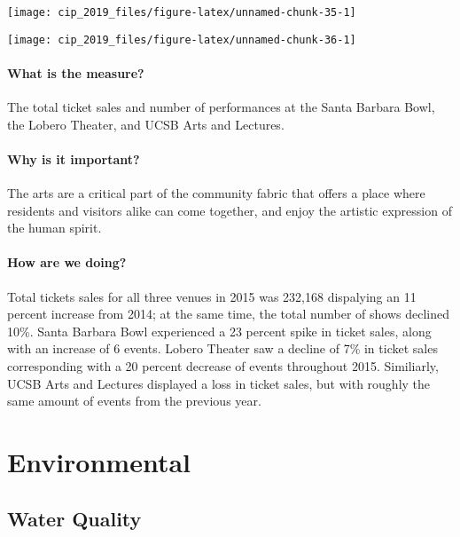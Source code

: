 \documentclass[]{book}
\theoremstyle{definition}
\theoremstyle{definition}
\theoremstyle{definition}
\theoremstyle{remark}
\begin{document}
\texttt{[image: cip\_2019\_files/figure-latex/unnamed-chunk-35-1]}

\texttt{[image: cip\_2019\_files/figure-latex/unnamed-chunk-36-1]}

\subsubsection*{What is the measure?}\label{what-is-the-measure-16}

The total ticket sales and number of performances at the Santa Barbara
Bowl, the Lobero Theater, and UCSB Arts and Lectures.

\subsubsection*{Why is it important?}\label{why-is-it-important-15}

The arts are a critical part of the community fabric that offers a place
where residents and visitors alike can come together, and enjoy the
artistic expression of the human spirit.

\subsubsection*{How are we doing?}\label{how-are-we-doing-21}

Total tickets sales for all three venues in 2015 was 232,168 dispalying
an 11 percent increase from 2014; at the same time, the total number of
shows declined 10\%. Santa Barbara Bowl experienced a 23 percent spike
in ticket sales, along with an increase of 6 events. Lobero Theater saw
a decline of 7\% in ticket sales corresponding with a 20 percent
decrease of events throughout 2015. Similiarly, UCSB Arts and Lectures
displayed a loss in ticket sales, but with roughly the same amount of
events from the previous year.

\chapter*{Environmental}\label{environmental}

\section*{Water Quality}\label{water-quality}
\end{document}
